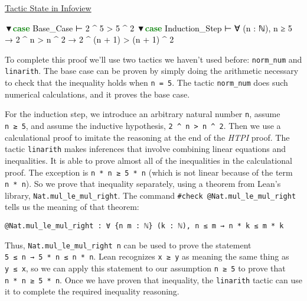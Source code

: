\documentclass[
  letterpaper,
  DIV=11,
  numbers=noendperiod]{scrreprt}
\newenvironment{Shaded}{\begin{snugshade}}{\end{snugshade}}
\newcommand{\NormalTok}[1]{\textcolor[rgb]{0.00,0.23,0.31}{#1}}
\newcommand{\RegionMarkerTok}[1]{\textcolor[rgb]{0.00,0.23,0.31}{#1}}
\newcommand{\SpecialCharTok}[1]{\textcolor[rgb]{0.37,0.37,0.37}{#1}}
\renewcommand{\NormalTok}[1]{\textcolor[HTML]{000000}{#1}}
\renewcommand{\SpecialCharTok}[1]{}
\renewcommand{\RegionMarkerTok}[1]{▼\:\textcolor[HTML]{008000}{\textbf{#1}}}
\newenvironment{ind}
	{\begin{list}{}{\setlength{\leftmargin}{1em}}\item\relax}
	{\end{list}}
\newcommand{\nobreakShaded}{\renewenvironment{Shaded}
	{\begin{tcolorbox}[frame hidden, enhanced, interior hidden, boxrule=0pt,
		borderline west={3pt}{0pt}{shadecolor}, sharp corners]}
	{\end{tcolorbox}}}
\newenvironment{outpt}
	{\nobreakShaded\begin{minipage}[t]{0.32\textwidth}
		\uline{Tactic State in Infoview}}
	{\end{minipage}}
\theoremstyle{remark}
\begin{document}
\begin{outpt}

\begin{Shaded}
\begin{Highlighting}[]
\RegionMarkerTok{case}\NormalTok{ Base\_Case}
\NormalTok{⊢ 2 \^{} 5 \textgreater{} 5 \^{} 2}
\RegionMarkerTok{case}\NormalTok{ Induction\_Step}
\NormalTok{⊢ ∀ (n : ℕ), n ≥ 5 →}
\SpecialCharTok{\textgreater{}\textgreater{}}\NormalTok{  2 \^{} n \textgreater{} n \^{} 2 →}
\SpecialCharTok{\textgreater{}\textgreater{}}\NormalTok{  2 \^{} (n + 1) \textgreater{}}
\SpecialCharTok{\textgreater{}\textgreater{}}\NormalTok{      (n + 1) \^{} 2}
\end{Highlighting}
\end{Shaded}

\end{outpt}

To complete this proof we'll use two tactics we haven't used before:
\texttt{norm\_num} and \texttt{linarith}. The base case can be proven by
simply doing the arithmetic necessary to check that the inequality holds
when \texttt{n\ =\ 5}. The tactic \texttt{norm\_num} does such numerical
calculations, and it proves the base case.

For the induction step, we introduce an arbitrary natural number
\texttt{n}, assume \texttt{n\ ≥\ 5}, and assume the inductive
hypothesis, \texttt{2\ \^{}\ n\ \textgreater{}\ n\ \^{}\ 2}. Then we use
a calculational proof to imitate the reasoning at the end of the
\emph{HTPI} proof. The tactic \texttt{linarith} makes inferences that
involve combining linear equations and inequalities. It is able to prove
almost all of the inequalities in the calculational proof. The exception
is \texttt{n\ *\ n\ ≥\ 5\ *\ n} (which is not linear because of the term
\texttt{n\ *\ n}). So we prove that inequality separately, using a
theorem from Lean's library, \texttt{Nat.mul\_le\_mul\_right}. The
command \texttt{\#check\ @Nat.mul\_le\_mul\_right} tells us the meaning
of that theorem:

\begin{ind}

\begin{verbatim}
@Nat.mul_le_mul_right : ∀ {n m : ℕ} (k : ℕ), n ≤ m → n * k ≤ m * k
\end{verbatim}

\end{ind}

Thus, \texttt{Nat.mul\_le\_mul\_right\ n} can be used to prove the
statement \texttt{5\ ≤\ n\ →\ 5\ *\ n\ ≤\ n\ *\ n}. Lean recognizes
\texttt{x\ ≥\ y} as meaning the same thing as \texttt{y\ ≤\ x}, so we
can apply this statement to our assumption \texttt{n\ ≥\ 5} to prove
that \texttt{n\ *\ n\ ≥\ 5\ *\ n}. Once we have proven that inequality,
the \texttt{linarith} tactic can use it to complete the required
inequality reasoning.
\end{document}
